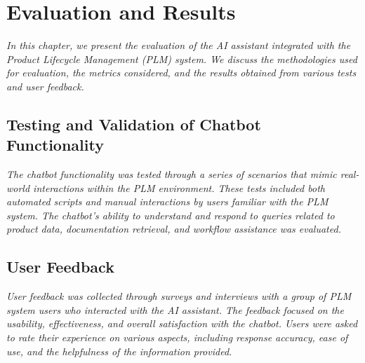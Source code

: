 \chapter{Evaluation and Results}
\label{ch:evaluation-and-results}

\textit{In this chapter, we present the evaluation of the AI assistant integrated with the Product Lifecycle Management (PLM) system. We discuss the methodologies used for evaluation, the metrics considered, and the results obtained from various tests and user feedback.}

\section{Testing and Validation of Chatbot Functionality}
\label{sec:testing-and-validation-of-chatbot-functionality}

\textit{The chatbot functionality was tested through a series of scenarios that mimic real-world interactions within the PLM environment. These tests included both automated scripts and manual interactions by users familiar with the PLM system. The chatbot's ability to understand and respond to queries related to product data, documentation retrieval, and workflow assistance was evaluated.}

\section{User Feedback}
\label{sec:user-feedback}

\textit{User feedback was collected through surveys and interviews with a group of PLM system users who interacted with the AI assistant. The feedback focused on the usability, effectiveness, and overall satisfaction with the chatbot. Users were asked to rate their experience on various aspects, including response accuracy, ease of use, and the helpfulness of the information provided.}
